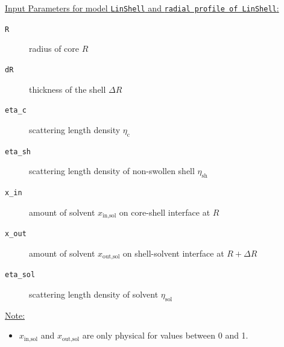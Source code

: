 \underline{Input Parameters for model \texttt{LinShell} and \texttt{radial profile of LinShell}:}\\
\begin{description}
\item[\texttt{R}] radius of core $R$
\item[\texttt{dR}] thickness of the shell $\Delta R$
\item[\texttt{eta\_c}] scattering length density $\eta_\text{c}$
\item[\texttt{eta\_sh}] scattering length density of non-swollen shell $\eta_\text{sh}$
\item[\texttt{x\_in}] amount of solvent $x_\text{in,sol}$ on core-shell interface at $R$
\item[\texttt{x\_out}] amount of solvent $x_\text{out,sol}$ on shell-solvent interface at $R+\Delta R$
\item[\texttt{eta\_sol}] scattering length density of solvent $\eta_\text{sol}$
\end{description}

\noindent\underline{Note:}
\begin{itemize}
\item $x_\text{in,sol}$ and $x_\text{out,sol}$ are only physical for values between 0 and 1.
\end{itemize}


